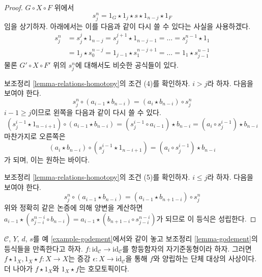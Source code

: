 \begin{proof}
\medskip\noindent
$G \circ X \circ F$ 위에서
$$
s^n_j = 1_G \star 1_j \star s \star 1_{n - j} \star 1_F
$$
임을 상기하자. 아래에서는 이를 다음과 같이 다시 쓸 수 있다는 사실을
사용하겠다.
\begin{align*}
s^n_j
& =
s^j_j \star 1_{n - j} = s^{j + 1}_j \star 1_{n - j - 1} = \ldots =
s^{n - 1}_j \star 1_1 \\
& =
1_j \star s^{n - j}_0 = 1_{j - 1} \star s^{n - j + 1}_1 = \ldots =
1_1 \star s^{n - 1}_{j - 1}
\end{align*}
물론 $G' \circ X \circ F'$ 위의 $s^n_j$에 대해서도 비슷한 공식들이
있다.

\medskip\noindent
보조정리 \ref{lemma-relations-homotopy}의 조건 (4)를 확인하자.
$i > j$라 하자. 다음을 보여야 한다.
$$
s^n_j \circ (a_{i - 1} \star b_{n - i}) =
(a_i \star b_{n - i}) \circ s^n_j
$$
$i - 1 \geq j$이므로 왼쪽을 다음과 같이 다시 쓸 수 있다.
$$
(s^{i - 1}_j \star 1_{n - i + 1}) \circ (a_{i - 1} \star b_{n - i}) =
(s^{i - 1}_j \circ a_{i - 1}) \star b_{n - i} =
(a_i \circ s^{i - 1}_j) \star b_{n - i}
$$
마찬가지로 오른쪽은
$$
(a_i \star b_{n - i}) \circ (s^{i - 1}_j \star 1_{n - i + 1}) =
(a_i \circ s^{i - 1}_j) \star b_{n - i}
$$
가 되며, 이는 원하는 바이다.

\medskip\noindent
보조정리 \ref{lemma-relations-homotopy}의 조건 (5)를 확인하자.
$i \leq j$라 하자. 다음을 보여야 한다.
$$
s^n_j \circ (a_{i - 1} \star b_{n - i}) =
(a_{i - 1} \star b_{n + 1 - i}) \circ s^n_j
$$
위와 정확히 같은 논증에 의해 양변을 계산하면
$a_{i - 1} \star (s^{n - i}_{j - i} \circ b_{n - i}) =
a_{i - 1} \star (b_{n + 1 - i} \circ s^{n - i}_{j - i})$가 되므로
이 등식은 성립한다.
\end{proof}

\begin{lemma}
\label{lemma-godement-before-after}
$\mathcal{C}$, $Y$, $d$, $s$를 예 \ref{example-godement}에서와 같이
놓고 보조정리 \ref{lemma-godement}의 등식들을 만족한다고 하자.
$f : \text{id}_\mathcal{C} \to \text{id}_\mathcal{C}$를 항등함자의
자기준동형이라 하자. 그러면
$f \star 1_X, 1_X \star f : X \to X$는 증강
$\epsilon : X \to \text{id}_\mathcal{C}$을 통해 $f$와 양립하는 단체
대상의 사상이다. 더 나아가 $f \star 1_X$와 $1_X \star f$는
호모토픽이다.
\end{lemma}

